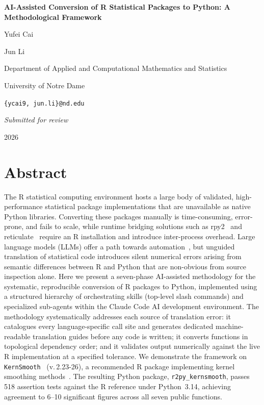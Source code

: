 \documentclass[12pt,a4paper]{article}
\newcommand{\pkg}[1]{\texttt{#1}}
\begin{document}
\begin{titlepage}
\centering
\vspace*{2.5cm}
{\LARGE\bfseries AI-Assisted Conversion of R Statistical Packages to Python: A Methodological Framework\par}
\vspace{1.2cm}
{\large Yufei Cai\par}
{\large Jun Li\par}
\vspace{0.5cm}
{\normalsize Department of Applied and Computational Mathematics and Statistics\par}
{\normalsize University of Notre Dame\par}
{\normalsize \texttt{\{ycai9, jun.li\}@nd.edu}\par}
\vfill
{\normalsize\textit{Submitted for review}\par}
\vspace{0.3cm}
{\normalsize 2026\par}
\end{titlepage}
\section*{Abstract}

The R statistical computing environment hosts a large body of validated, high-performance statistical package implementations that are unavailable as native Python libraries. Converting these packages manually is time-consuming, error-prone, and fails to scale, while runtime bridging solutions such as rpy2~\cite{gautier2008rpy2} and reticulate~\cite{ushey2023reticulate} require an R installation and introduce inter-process overhead. Large language models (LLMs) offer a path towards automation~\cite{chen2021codex,roziere2020transcoder,wang2021codet5}, but unguided translation of statistical code introduces silent numerical errors arising from semantic differences between R and Python that are non-obvious from source inspection alone. Here we present a seven-phase AI-assisted methodology for the systematic, reproducible conversion of R packages to Python, implemented using a structured hierarchy of orchestrating skills (top-level slash commands) and specialized sub-agents within the Claude Code AI development environment. The methodology systematically addresses each source of translation error: it catalogues every language-specific call site and generates dedicated machine-readable translation guides before any code is written; it converts functions in topological dependency order; and it validates output numerically against the live R implementation at a specified tolerance. We demonstrate the framework on \pkg{KernSmooth}~\cite{wandjones1995} (v.\,2.23-26), a recommended R package implementing kernel smoothing methods~\cite{sheatherjones1991,ruppertsheatherwand1995,wand1994}. The resulting Python package, \pkg{r2py\_kernsmooth}, passes 518 assertion tests against the R reference under Python~3.14, achieving agreement to 6--10 significant figures across all seven public functions.
\end{document}
